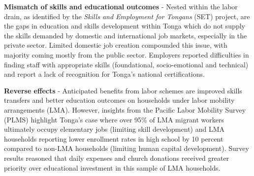 \documentclass[9pt,a4paper,twocolumn,twoside]{tau-class/tau}
\begin{document}
    		
    	

   


 \textbf{Mismatch of skills and educational outcomes} - Nested within the labor drain, as identified by the \textit{Skills and Employment for Tongans} (SET) project, are the gaps in education and skills development within Tonga which do not supply the skills demanded by domestic and international job markets, especially in the private sector. Limited domestic job creation compounded this issue, with majority coming mostly from the public sector. Employers reported difficulties in finding staff with appropriate skills  (foundational, socio-emotional and technical) and report a lack of recognition for Tonga's national certifications. 

 \textbf{Reverse effects} - 
 Anticipated benefits from labor schemes are improved skills transfers and better education outcomes on households under labor mobility arrangements (LMA). However, insights from the Pacific Labor Mobility Survey (PLMS) highlight Tonga's case where over 95\% of LMA migrant workers ultimately occupy elementary jobs (limiting skill development) and LMA households reporting lower enrollment rates in high school by 10 percent compared to non-LMA households (limiting human capital development). Survey results reasoned that daily expenses and church donations received greater priority over educational investment in this sample of LMA households.

\end{document}
